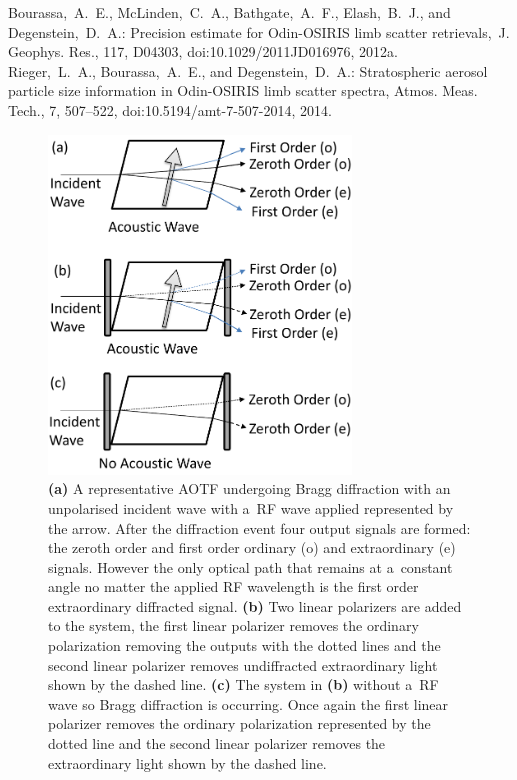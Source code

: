 \documentclass[12pt, notitlepage]{article}
\begin{document}
\hrulefill

Bourassa,~A.~E., McLinden,~C.~A., Bathgate,~A.~F., Elash,~B.~J., and
Degenstein,~D.~A.: Precision estimate for Odin-OSIRIS limb scatter
retrievals,~J. Geophys. Res., 117, D04303,
doi:10.1029/2011JD016976,
2012a.\\

Rieger,~L.~A., Bourassa,~A.~E., and Degenstein,~D.~A.: Stratospheric aerosol
particle size information in Odin-OSIRIS limb scatter spectra, Atmos. Meas.
Tech., 7, 507--522,
doi:10.5194/amt-7-507-2014,
2014.

\hrulefill

\begin{figure}
\includegraphics[height=90mm]{amt-2015-329-discussions-f02.pdf}
\caption{\textbf{(a)} A representative AOTF undergoing Bragg diffraction with an
  unpolarised incident wave with a~RF wave applied represented by the
  arrow. After the diffraction event four output signals are formed:
  the zeroth order and first order ordinary (o) and extraordinary (e)
  signals. However the only optical path that remains at a~constant
  angle no matter the applied RF wavelength is the first order
  extraordinary diffracted signal. \textbf{(b)} Two linear polarizers
  are added to the system, the first linear polarizer removes the
  ordinary polarization removing the outputs with the dotted lines and
  the second linear polarizer removes undiffracted extraordinary light
  shown by the dashed line. \textbf{(c)} The system in \textbf{(b)}
  without a~RF wave so Bragg diffraction is occurring. Once again the
  first linear polarizer removes the ordinary polarization represented
  by the dotted line and the second linear polarizer removes the
  extraordinary light shown by the dashed line.}
\label{amtd-2015-0329-f02.pdf}
\end{figure}
\end{document}
